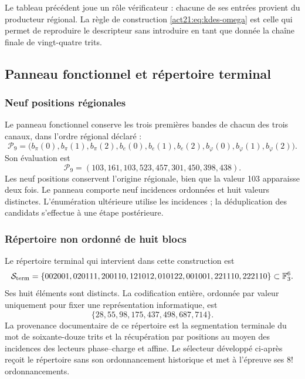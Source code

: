 Le tableau précédent joue un rôle vérificateur : chacune de ses entrées provient du producteur régional. La règle de construction \eqref{act21:eq:kdes-omega} est celle qui permet de reproduire le descripteur sans introduire en tant que donnée la chaîne finale de vingt-quatre trits.

\subsection{Panneau fonctionnel et répertoire terminal}

\subsubsection{Neuf positions régionales}

Le panneau fonctionnel conserve les trois premières bandes de chacun des trois canaux, dans l'ordre régional déclaré :
\begin{equation}
 \mathcal P_9=
 \bigl(b_\pi(0),b_\pi(1),b_\pi(2),
       b_e(0),b_e(1),b_e(2),
       b_\varphi(0),b_\varphi(1),b_\varphi(2)\bigr).
 \label{act21:eq:kdes-panel}
\end{equation}
Son évaluation est
\[
 \mathcal P_9=(103,161,103,523,457,301,450,398,438).
\]
Les neuf positions conservent l'origine régionale, bien que la valeur
103 apparaisse deux fois. Le panneau comporte neuf incidences ordonnées et
huit valeurs distinctes. L'énumération ultérieure utilise les incidences ;
la déduplication des candidats s'effectue à une étape postérieure.

\subsubsection{Répertoire non ordonné de huit blocs}

Le répertoire terminal qui intervient dans cette construction est
\begin{equation}
 \mathcal S_{\rm term}=
 \{002001,020111,200110,121012,
   010122,001001,221110,222110\}\subset\mathbb F_3^6.
 \label{act21:eq:kdes-sterm}
\end{equation}
Ses huit éléments sont distincts. La codification entière, ordonnée par
valeur uniquement pour fixer une représentation informatique, est
\[
 \{28,55,98,175,437,498,687,714\}.
\]
La provenance documentaire de ce répertoire est la segmentation terminale du mot de soixante-douze trits et la récupération par positions au moyen des incidences des lecteurs phase--charge et affine. Le sélecteur développé ci-après reçoit le répertoire sans son ordonnancement historique et met à l'épreuve ses $8!$ ordonnancements.

